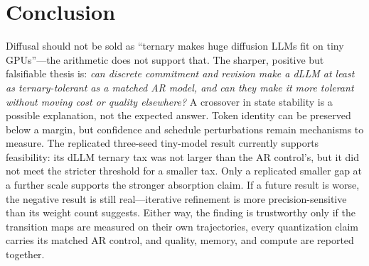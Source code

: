 \documentclass[11pt]{article}
\begin{document}
\section{Conclusion}

Diffusal should not be sold as ``ternary makes huge diffusion LLMs fit on tiny GPUs''---the arithmetic does not support that. The sharper, positive but falsifiable thesis is: \emph{can discrete commitment and revision make a dLLM at least as ternary-tolerant as a matched AR model, and can they make it more tolerant without moving cost or quality elsewhere?} A crossover in state stability is a possible explanation, not the expected answer. Token identity can be preserved below a margin, but confidence and schedule perturbations remain mechanisms to measure. The replicated three-seed tiny-model result currently supports feasibility: its dLLM ternary tax was not larger than the AR control's, but it did not meet the stricter threshold for a smaller tax. Only a replicated smaller gap at a further scale supports the stronger absorption claim. If a future result is worse, the negative result is still real---iterative refinement is more precision-sensitive than its weight count suggests. Either way, the finding is trustworthy only if the transition maps are measured on their own trajectories, every quantization claim carries its matched AR control, and quality, memory, and compute are reported together.
\end{document}
